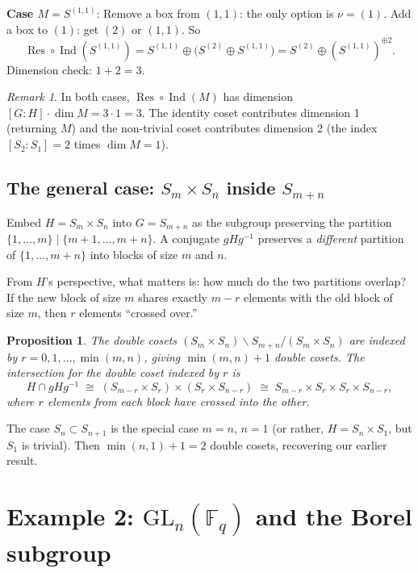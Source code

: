\documentclass[12pt,a4paper]{article}
\newtheorem{proposition}[theorem]{Proposition}
\theoremstyle{definition}
\theoremstyle{remark}
\newtheorem{remark}[theorem]{Remark}
\newcommand{\F}{\mathbb{F}}
\newcommand{\Ind}{\operatorname{Ind}}
\newcommand{\Res}{\operatorname{Res}}
\newcommand{\GL}{\mathrm{GL}}
\begin{document}
\medskip\noindent\textbf{Case $M = S^{(1,1)}$}: Remove a box from
$(1,1)$: the only option is $\nu = (1)$. Add a box to $(1)$: get
$(2)$ or $(1,1)$. So
\[
  \Res \circ \Ind(S^{(1,1)})
  = S^{(1,1)} \oplus \bigl(S^{(2)} \oplus S^{(1,1)}\bigr)
  = S^{(2)} \oplus (S^{(1,1)})^{\oplus 2}.
\]
Dimension check: $1 + 2 = 3$. \checkmark

\begin{remark}
In both cases, $\Res \circ \Ind(M)$ has dimension
$[G:H] \cdot \dim M = 3 \cdot 1 = 3$. The identity coset contributes
dimension 1 (returning $M$) and the non-trivial coset contributes
dimension 2 (the index $[S_2 : S_1] = 2$ times $\dim M = 1$).
\end{remark}

\subsection{The general case: $S_m \times S_n$ inside $S_{m+n}$}

Embed $H = S_m \times S_n$ into $G = S_{m+n}$ as the subgroup
preserving the partition $\{1, \ldots, m\} \mid \{m{+}1, \ldots, m{+}n\}$.
A conjugate $gHg^{-1}$ preserves a \emph{different} partition of
$\{1, \ldots, m{+}n\}$ into blocks of size $m$ and $n$.

From $H$'s perspective, what matters is: how much do the two
partitions overlap? If the new block of size $m$ shares exactly
$m - r$ elements with the old block of size $m$, then $r$ elements
``crossed over.''

\begin{proposition}
The double cosets $(S_m \times S_n) \backslash S_{m+n} / (S_m \times S_n)$
are indexed by $r = 0, 1, \ldots, \min(m,n)$, giving $\min(m,n) + 1$
double cosets. The intersection for the double coset indexed by $r$ is
\[
  H \cap gHg^{-1} \;\cong\;
  (S_{m-r} \times S_r) \times (S_r \times S_{n-r})
  \;\cong\;
  S_{m-r} \times S_r \times S_r \times S_{n-r},
\]
where $r$ elements from each block have crossed into the other.
\end{proposition}

The case $S_n \subset S_{n+1}$ is the special case $m = n$, $n = 1$
(or rather, $H = S_n \times S_1$, but $S_1$ is trivial). Then
$\min(n, 1) + 1 = 2$ double cosets, recovering our earlier result.

\section{Example 2: $\GL_n(\F_q)$ and the Borel subgroup}
\label{sec:GLn}
\end{document}
